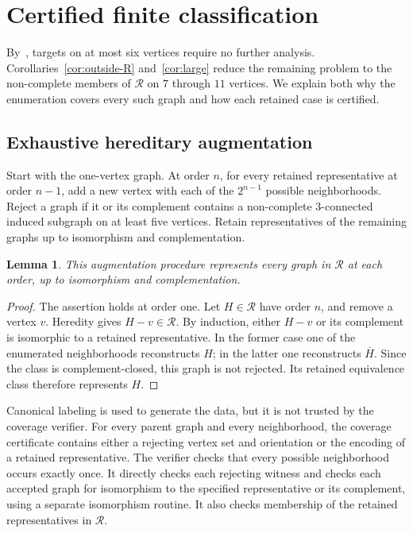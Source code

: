 \documentclass[11pt,reqno]{amsart}
\newtheorem{lemma}[theorem]{Lemma}
\theoremstyle{definition}
\theoremstyle{remark}
\newcommand{\comp}[1]{\overline{#1}}
\newcommand{\Rclass}{\mathcal{R}}
\begin{document}
\section{Certified finite classification}\label{sec:finitecases}

By~\cite[Theorem~1.9]{FHHS}, targets on at most six vertices require no further analysis. Corollaries~\ref{cor:outside-R} and~\ref{cor:large} reduce the remaining problem to the non-complete members of $\Rclass$ on $7$ through $11$ vertices. We explain both why the enumeration covers every such graph and how each retained case is certified.

\subsection{Exhaustive hereditary augmentation}

Start with the one-vertex graph. At order $n$, for every retained representative at order $n-1$, add a new vertex with each of the $2^{n-1}$ possible neighborhoods. Reject a graph if it or its complement contains a non-complete $3$-connected induced subgraph on at least five vertices. Retain representatives of the remaining graphs up to isomorphism and complementation.

\begin{lemma}\label{lem:coverage}
This augmentation procedure represents every graph in $\Rclass$ at each order, up to isomorphism and complementation.
\end{lemma}
\begin{proof}
The assertion holds at order one. Let $H\in\Rclass$ have order $n$, and remove a vertex $v$. Heredity gives $H-v\in\Rclass$. By induction, either $H-v$ or its complement is isomorphic to a retained representative. In the former case one of the enumerated neighborhoods reconstructs $H$; in the latter one reconstructs $\comp H$. Since the class is complement-closed, this graph is not rejected. Its retained equivalence class therefore represents $H$.
\end{proof}

Canonical labeling is used to generate the data, but it is not trusted by the coverage verifier. For every parent graph and every neighborhood, the coverage certificate contains either a rejecting vertex set and orientation or the encoding of a retained representative. The verifier checks that every possible neighborhood occurs exactly once. It directly checks each rejecting witness and checks each accepted graph for isomorphism to the specified representative or its complement, using a separate isomorphism routine. It also checks membership of the retained representatives in $\Rclass$.
\end{document}
